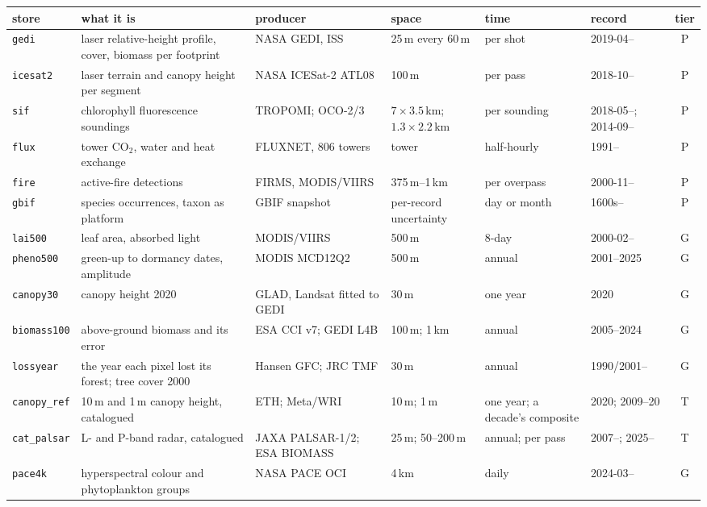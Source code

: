 \documentclass[10pt]{article}
\newcommand{\code}[1]{\texttt{#1}}
\begin{document}
\begin{table}[t]
\centering\scriptsize\setlength{\tabcolsep}{3pt}
\begin{tabular}{@{}L{1.6cm}L{4.4cm}L{2.3cm}L{2.0cm}L{1.6cm}L{1.9cm}c@{}}
\toprule
store & what it is & producer & space & time & record & tier \\
\midrule
\code{gedi} & laser relative-height profile, cover, biomass per footprint & NASA GEDI, ISS & 25\,m every 60\,m & per shot & 2019-04-- & P \\
\code{icesat2} & laser terrain and canopy height per segment & NASA ICESat-2 ATL08 & 100\,m & per pass & 2018-10-- & P \\
\code{sif} & chlorophyll fluorescence soundings & TROPOMI; OCO-2/3 & $7\times3.5$\,km; $1.3\times2.2$\,km & per sounding & 2018-05--; 2014-09-- & P \\
\code{flux} & tower CO$_2$, water and heat exchange & FLUXNET, 806 towers & tower & half-hourly & 1991-- & P \\
\code{fire} & active-fire detections & FIRMS, MODIS/VIIRS & 375\,m--1\,km & per overpass & 2000-11-- & P \\
\code{gbif} & species occurrences, taxon as platform & GBIF snapshot & per-record uncertainty & day or month & 1600s-- & P \\
\code{lai500} & leaf area, absorbed light & MODIS/VIIRS & 500\,m & 8-day & 2000-02-- & G \\
\code{pheno500} & green-up to dormancy dates, amplitude & MODIS MCD12Q2 & 500\,m & annual & 2001--2025 & G \\
\code{canopy30} & canopy height 2020 & GLAD, Landsat fitted to GEDI & 30\,m & one year & 2020 & G \\
\code{biomass100} & above-ground biomass and its error & ESA CCI v7; GEDI L4B & 100\,m; 1\,km & annual & 2005--2024 & G \\
\code{lossyear} & the year each pixel lost its forest; tree cover 2000 & Hansen GFC; JRC TMF & 30\,m & annual & 1990/2001-- & G \\
\code{canopy\_ref} & 10\,m and 1\,m canopy height, catalogued & ETH; Meta/WRI & 10\,m; 1\,m & one year; a decade's composite & 2020; 2009--20 & T \\
\code{cat\_palsar} & L- and P-band radar, catalogued & JAXA PALSAR-1/2; ESA BIOMASS & 25\,m; 50--200\,m & annual; per pass & 2007--; 2025-- & T \\
\code{pace4k} & hyperspectral colour and phytoplankton groups & NASA PACE OCI & 4\,km & daily & 2024-03-- & G \\

\end{tabular}
\end{table}
\end{document}
